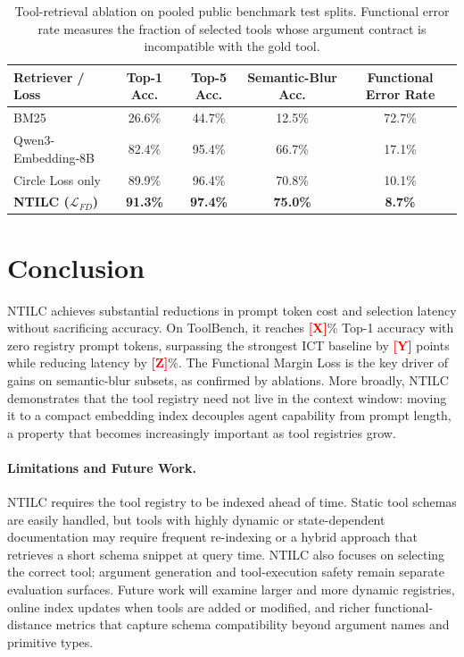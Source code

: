 \documentclass{article}
\newcommand{\placeholder}[1]{\textcolor{red}{\textbf{[#1]}}}
\begin{document}
\begin{table}[H]
\caption{Tool-retrieval ablation on pooled public benchmark test splits. Functional error rate measures the fraction of selected tools whose argument contract is incompatible with the gold tool.}
\label{tab:retrieval}
\centering
\small
\begin{tabular}{lcccc}
\toprule
Retriever / Loss & Top-1 Acc. & Top-5 Acc. & Semantic-Blur Acc. & Functional Error Rate \\
\midrule
BM25 & 26.6\% & 44.7\% & 12.5\% & 72.7\% \\
Qwen3-Embedding-8B & 82.4\% & 95.4\% & 66.7\% & 17.1\% \\
Circle Loss only & 89.9\% & 96.4\% & 70.8\% & 10.1\% \\
\textbf{NTILC ($\mathcal{L}_{FD}$)} & \textbf{91.3\%} & \textbf{97.4\%} & \textbf{75.0\%} & \textbf{8.7\%} \\
\bottomrule
\end{tabular}
\end{table}

\section{Conclusion}

NTILC achieves substantial reductions in prompt token cost and selection latency without sacrificing accuracy.
On ToolBench, it reaches \placeholder{X}\% Top-1 accuracy with zero registry prompt tokens, surpassing the strongest ICT baseline by \placeholder{Y} points while reducing latency by \placeholder{Z}\%.
The Functional Margin Loss is the key driver of gains on semantic-blur subsets, as confirmed by ablations.
More broadly, NTILC demonstrates that the tool registry need not live in the context window: moving it to a compact embedding index decouples agent capability from prompt length, a property that becomes increasingly important as tool registries grow.

\paragraph{Limitations and Future Work.}
NTILC requires the tool registry to be indexed ahead of time.
Static tool schemas are easily handled, but tools with highly dynamic or state-dependent documentation may require frequent re-indexing or a hybrid approach that retrieves a short schema snippet at query time.
NTILC also focuses on selecting the correct tool; argument generation and tool-execution safety remain separate evaluation surfaces.
Future work will examine larger and more dynamic registries, online index updates when tools are added or modified, and richer functional-distance metrics that capture schema compatibility beyond argument names and primitive types.
\end{document}
